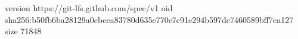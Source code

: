 version https://git-lfs.github.com/spec/v1
oid sha256:b50fb6ba28129a0cbeca83780d635e770e7c91e294b597dc7460589bff7ea127
size 71848
